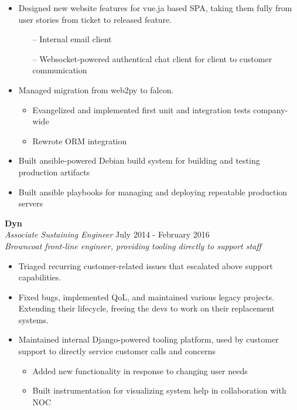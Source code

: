 \begin{minipage}[t]{\linewidth}
  \begin{itemize}
    \item Designed new website features for vue.ja based SPA, taking them fully from user stories from ticket to released feature.
      \begin{itemize}
        \item[--] Internal email client
        \item[--] Websocket-powered authentical chat client for client to customer communication
      \end{itemize}
    \item Managed migration from web2py to falcon.
      \begin{itemize}
        \item Evangelized and implemented first unit and integration tests company-wide
        \item Rewrote ORM integration
      \end{itemize}
    \item Built ansible-powered Debian build system for building and testing production artifacts
    \item Built ansible playbooks for managing and deploying repeatable production servers
  \end{itemize}
\end{minipage}

\large{\textbf{Dyn}} \\
\textit{Associate Sustaining Engineer} \hfill July 2014 - February 2016 \\[3.75pt]
\textit{Browncoat front-line engineer, providing tooling directly to support staff}

\begin{minipage}[t]{\linewidth}
  \begin{itemize}
    \item Triaged recurring customer-related issues that escalated above support capabilities.
    \item Fixed bugs, implemented QoL, and maintained various legacy projects. Extending their lifecycle, freeing the devs to work on their replacement systems.
    \item Maintained internal Django-powered tooling platform, used by customer support to directly service customer calls and concerns
      \begin{itemize}
        \item Added new functionality in response to changing user needs
        \item Built instrumentation for visualizing system help in collaboration with NOC
      \end{itemize}
  \end{itemize}
\end{minipage}

